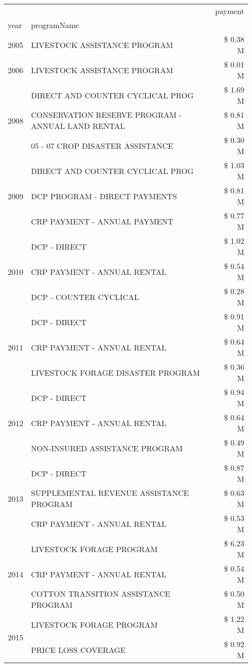 \begin{tabular}{llr}
\toprule
 &  & payment \\
year & programName &  \\
\midrule
2005 & LIVESTOCK ASSISTANCE PROGRAM & \$ 0.38 M \\
\cline{1-3}
2006 & LIVESTOCK ASSISTANCE PROGRAM & \$ 0.01 M \\
\cline{1-3}
\multirow[t]{3}{*}{2008} & DIRECT AND COUNTER CYCLICAL PROG & \$ 1.69 M \\
 & CONSERVATION RESERVE PROGRAM - ANNUAL LAND RENTAL & \$ 0.81 M \\
 & 05 - 07 CROP DISASTER ASSISTANCE & \$ 0.30 M \\
\cline{1-3}
\multirow[t]{3}{*}{2009} & DIRECT AND COUNTER CYCLICAL PROG & \$ 1.03 M \\
 & DCP PROGRAM - DIRECT PAYMENTS & \$ 0.81 M \\
 & CRP PAYMENT - ANNUAL PAYMENT & \$ 0.77 M \\
\cline{1-3}
\multirow[t]{3}{*}{2010} & DCP - DIRECT & \$ 1.02 M \\
 & CRP PAYMENT - ANNUAL RENTAL & \$ 0.54 M \\
 & DCP - COUNTER CYCLICAL & \$ 0.28 M \\
\cline{1-3}
\multirow[t]{3}{*}{2011} & DCP - DIRECT & \$ 0.91 M \\
 & CRP PAYMENT - ANNUAL RENTAL & \$ 0.64 M \\
 & LIVESTOCK FORAGE DISASTER PROGRAM & \$ 0.36 M \\
\cline{1-3}
\multirow[t]{3}{*}{2012} & DCP - DIRECT & \$ 0.94 M \\
 & CRP PAYMENT - ANNUAL RENTAL & \$ 0.64 M \\
 & NON-INSURED ASSISTANCE PROGRAM & \$ 0.49 M \\
\cline{1-3}
\multirow[t]{3}{*}{2013} & DCP - DIRECT & \$ 0.87 M \\
 & SUPPLEMENTAL REVENUE ASSISTANCE PROGRAM & \$ 0.63 M \\
 & CRP PAYMENT - ANNUAL RENTAL & \$ 0.53 M \\
\cline{1-3}
\multirow[t]{3}{*}{2014} & LIVESTOCK FORAGE PROGRAM & \$ 6.23 M \\
 & CRP PAYMENT - ANNUAL RENTAL & \$ 0.54 M \\
 & COTTON TRANSITION ASSISTANCE PROGRAM & \$ 0.50 M \\
\cline{1-3}
\multirow[t]{3}{*}{2015} & LIVESTOCK FORAGE PROGRAM & \$ 1.22 M \\
 & PRICE LOSS COVERAGE & \$ 0.92 M \\

\end{tabular}
